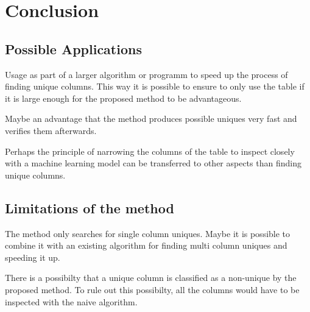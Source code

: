 \chapter{Conclusion} %

\section{Possible Applications}
Usage as part of a larger algorithm or programm to speed up the process of finding unique columns. This way it is possible to ensure to only use the table if it is large enough for the proposed method to be advantageous.

Maybe an advantage that the method produces possible uniques very fast and verifies them afterwards.

Perhaps the principle of narrowing the columns of the table to inspect closely with a machine learning model can be transferred to other aspects than finding unique columns.


\section{Limitations of the method}
The method only searches for single column uniques. Maybe it is possible to combine it with an existing algorithm for finding multi column uniques and speeding it up.

There is a possibilty that a unique column is classified as a non-unique by the proposed method. To rule out this possibilty, all the columns would have to be inspected with the naive algorithm.
